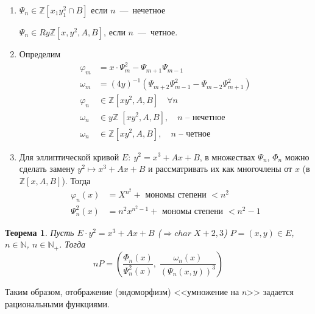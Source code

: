 \documentclass[12pt]{article}
\newcommand{\Z}{{{\mathbb Z}}}
\newtheorem{theorem}{Теорема}
\theoremstyle{definition}
\theoremstyle{definition}
\theoremstyle{definition}
\begin{document}
\begin{enumerate}
	\item ${\Psi _n} \in \Z\left[ {{x_1}y_1^2 \cap B} \right]$ если $n$~---~нечетное
	
	${\Psi _n} \in Ry\Z\left[ {x,{y^2},A,B} \right]$, если $n$~---~четное. 
	
	\item Определим
	$$
	\begin{aligned}
	{\varphi _m} &= x \cdot \Psi _m^2 - {\Psi _{m + 1}}{\Psi _{m - 1}} \\
	{\omega _m} &= {\left( {4y} \right)^{ - 1}}\left( {{\Psi _{m + 2}}\Psi _{m - 1}^2 - {\Psi _{m - 2}}\Psi _{m + 1}^2} \right) \\
	{\varphi _n} &\in \Z\left[ {x{y^2},A,B} \right]\quad \forall n \\
	{\omega _n} &\in y\Z\;\left[ {x{y^2},A,B} \right],\quad n{\text{  --  нечетное}} \\
	{\omega _n} &\in \Z\left[ {x{y^2},A,B} \right],\quad n{\text{ -- четное}}
	\end{aligned}
	$$
	
	\item Для эллиптической кривой $E:\:{y^2} = {x^3} + Ax + B$, в множествах ${\Psi _n}$, ${\Phi _n}$ можно сделать замену ${y^2} \mapsto {x^3} + Ax + B$ и рассматривать их как многочлены от $x$ (в $\Z\left[ {x,A,B} \right]$). Тогда 
	$$
	\begin{aligned}
	{\varphi _n}\left( x \right) &= {X^{{n^2}}} + {\text{ мономы степени }} < {n^2} \\
	\Psi _n^2\left( x \right) &= {n^2}{x^{{n^2} - 1}} + {\text{ мономы степени }} < {n^2} - 1
	\end{aligned}
	$$
\end{enumerate}

\begin{theorem}
	\label{theor_03}
	Пусть $E \cdot {y^2} = {x^3} + Ax + B$ ($ \Rightarrow char\;X + 2,3$) $P = \left( {x,y} \right) \in E$, $n \in \mathbb{N}$, $n \in {\mathbb{N}_ + }$. Тогда
	$$nP = \left( {\frac{{{\Phi _n}\left( x \right)}}{{\Psi _n^2\left( x \right)}},\;\frac{{{\omega _n}\left( x \right)}}{{{{\left( {{\Psi _n}\left( {x,y} \right)} \right)}^3}}}} \right)
	$$
\end{theorem}

Таким образом, отображение (эндоморфизм) <<умножение на $n$>> задается рациональными функциями. 
\end{document}

